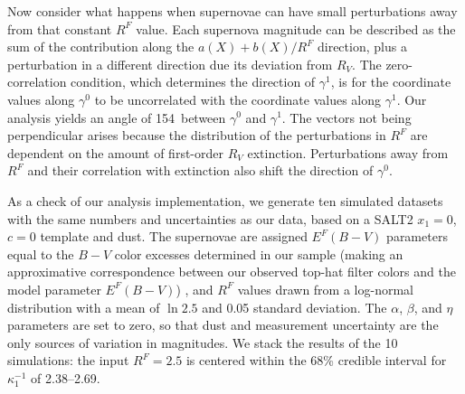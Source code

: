 \documentclass{aastex61}   	%
\begin{document}
Now consider what happens when supernovae can have small  perturbations away from that constant $R^F$ value.  Each supernova magnitude
can be described as the sum of the contribution along the $a(X)+b(X)/R^F$ direction, plus a perturbation in a different direction due its deviation  from $R_V$.
The zero-correlation condition, which determines the direction of $\gamma^1$,  is for the coordinate values along $\gamma^0$ to be uncorrelated with the coordinate values along $\gamma^1$.
Our analysis yields an angle of 154\arcdeg\ between  $\gamma^0$ and $\gamma^1$.
The vectors not being perpendicular arises because the distribution of the perturbations in $R^F$ are dependent on the amount of first-order $R_V$ extinction.
Perturbations away from $R^F$ and their correlation with extinction also shift the direction of $\gamma^0$.


\color{purple}
As a check of our analysis implementation, we generate ten simulated datasets with the same numbers and uncertainties as our data, based on a
SALT2 $x_1=0$, $c=0$ template and   dust.  The supernovae
are assigned $E^F(B-V)$ parameters equal to the $B-V$ color excesses determined in our sample
(making an approximative correspondence between our observed top-hat filter colors and the 
model parameter $E^F(B-V)$) , and $R^F$ values drawn from a log-normal
distribution with a mean of $\ln{2.5}$ and 0.05 standard deviation.  The $\alpha$, $\beta$, and $\eta$ parameters are set to zero, so that dust and
measurement uncertainty are the only sources of variation in magnitudes.  We stack the results of the 10 simulations: the input $R^F=2.5$ is centered
within the 68\% credible interval for $\kappa^{-1}_1$ of 2.38--2.69.

\color{black}
%
%
\end{document}
